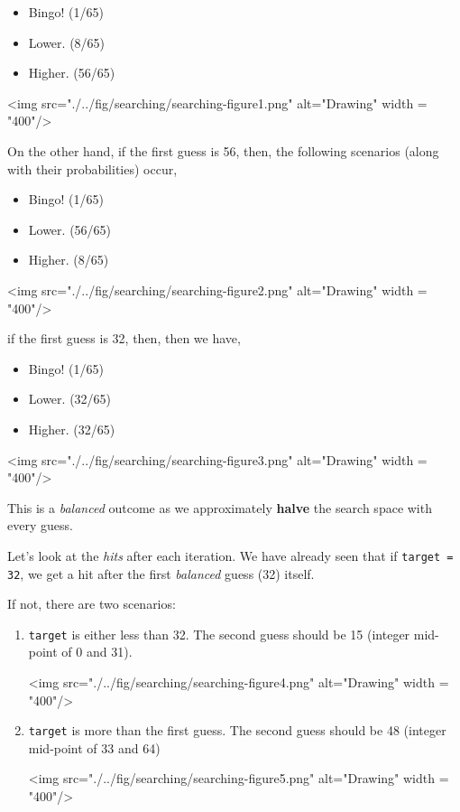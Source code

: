 \begin{itemize}
\item Bingo! (1/65)
\item Lower. (8/65)	
\item Higher. (56/65)
\end{itemize}

<img src="./../fig/searching/searching-figure1.png" alt="Drawing" width = "400"/>
\vskip 1cm

On the other hand, if the first guess is 56, then, the following scenarios (along with their probabilities) occur,

\begin{itemize}
\item Bingo! (1/65)
\item Lower. (56/65)	
\item Higher. (8/65)
\end{itemize}

<img src="./../fig/searching/searching-figure2.png" alt="Drawing" width = "400"/>
\vskip 1cm

if the first guess is 32, then, then we have,

\begin{itemize}
\item Bingo! (1/65)
\item Lower. (32/65)	
\item Higher. (32/65)
\end{itemize}

<img src="./../fig/searching/searching-figure3.png" alt="Drawing" width = "400"/>
\vskip 1cm

This is a \emph{balanced} outcome as we approximately \textbf{halve} the search space with every guess.

Let's look at the \emph{hits} after each iteration. We have already seen that if \texttt{target = 32}, we get a hit after the first \emph{balanced} guess (32) itself.

If not, there are two scenarios: 
\begin{enumerate}
	\item \texttt{target} is either less than 32. The second guess should be 15 (integer mid-point of 0 and 31). 

<img src="./../fig/searching/searching-figure4.png" alt="Drawing" width = "400"/>
\vskip 1cm

	\item \texttt{target} is more than the first guess. The second guess should be 48 (integer mid-point of 33 and 64)

<img src="./../fig/searching/searching-figure5.png" alt="Drawing" width = "400"/>
\end{enumerate}
	
